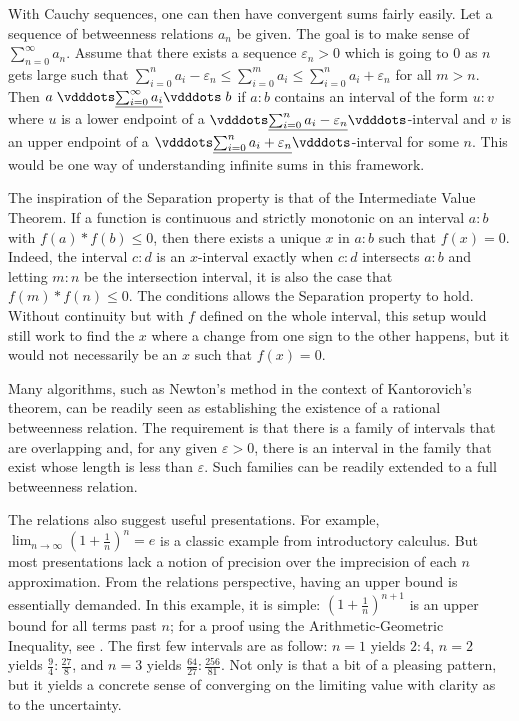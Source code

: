 \documentclass[12pt]{article}
\begin{document}
With Cauchy sequences, one can then have convergent sums fairly easily. Let a sequence of betweenness relations $a_n$ be given. The goal is to make sense of $\sum_{n=0}^{\infty} a_n$. Assume that there exists a sequence $\varepsilon_n > 0$ which is going to 0 as $n$ gets large such that $\sum_{i=0}^n a_i - \varepsilon_n \leq \sum_{i=0}^m a_i \leq \sum_{i=0}^n a_i+ \varepsilon_n$ for all $m > n$. Then  $a \xrel[\sum_{i=0}^{\infty} a_i] b$ if $a:b$ contains an interval of the form $u:v$ where $u$ is a lower endpoint of a $\xrel[\sum_{i=0}^n a_i - \varepsilon_n ]$-interval and $v$ is an upper endpoint of a $\xrel[\sum_{i=0}^n a_i + \varepsilon_n ]$-interval for some $n$. This would be one way of understanding infinite sums in this framework. 

The inspiration of the Separation property is that of the Intermediate Value Theorem. If a function is continuous and strictly monotonic on an interval $a:b$ with $f(a)*f(b) \leq 0$, then there exists a unique $x$ in $a:b$ such that $f(x) = 0$. Indeed, the interval $c:d$ is an $x$-interval exactly when $c:d$ intersects $a:b$ and letting $m:n$ be the intersection interval, it is also the case that $f(m)*f(n) \leq 0$. The conditions allows the Separation property to hold. Without continuity but with $f$ defined on the whole interval, this setup would still work to find the $x$ where a change from one sign to the other  happens, but it would not necessarily be an $x$ such that $f(x) = 0$.

Many algorithms, such as Newton's method in the context of Kantorovich's theorem, can be readily seen as establishing the existence of a rational betweenness relation. The requirement is that there is a family of intervals that are overlapping and, for any given $\varepsilon >0$, there is an interval in the family that exist whose length is less than $\varepsilon$. Such families can be readily extended to a full betweenness relation. 

The relations also suggest useful presentations. For example, $\lim_{n \to \infty} (1+\frac{1}{n})^n = e$ is a classic example from introductory calculus. But most presentations lack a notion of precision over the imprecision of each $n$ approximation. From the relations perspective, having an upper bound is essentially demanded. In this example, it is simple: $(1 + \frac{1}{n})^{n+1}$ is an upper bound for all terms past $n$; for a proof using the Arithmetic-Geometric Inequality, see \cite{mend}. The first few intervals are as follow: $n=1$ yields $2:4$, $n=2$ yields $\frac{9}{4}:\frac{27}{8}$, and $n=3$ yields $\frac{64}{27}:\frac{256}{81}$. Not only is that a bit of a pleasing pattern, but it yields a concrete sense of converging on the limiting  value with clarity as to the uncertainty. 
\end{document}
